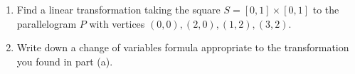 \documentclass[openany]{book}
\begin{document}
\begin{prob}[1]
    \begin{enumerate}
        \item[(a)]  Find a linear transformation taking the square \( S = [0, 1] \times [0, 1] \) to the parallelogram \( P \) with vertices \((0, 0), (2, 0), (1, 2), (3, 2)\).  
        \item[(b)]  Write down a change of variables formula appropriate to the transformation you found in part (a).
    \end{enumerate}
\end{prob}
\end{document}
